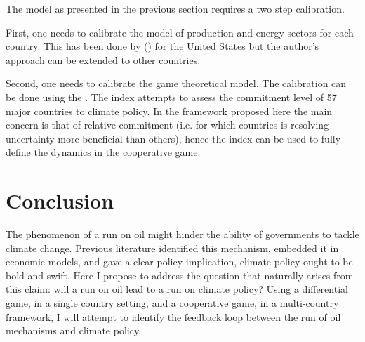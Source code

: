 \documentclass[american]{scrartcl}
\newcommand{\citein}[1]{\citeauthor{#1} (\citeyear{#1})}
\begin{document}
The model as presented in the previous section requires a two step calibration.

First, one needs to calibrate the model of production and energy sectors for each country. This has been done by \citein{Barnett2019} for the United States but the author's approach can be extended to other countries.

Second, one needs to calibrate the game theoretical model. The calibration can be done using the \citeauthor{Burck2020}. The index attempts to assess the commitment level of 57 major countries to climate policy. In the framework proposed here the main concern is that of relative commitment (i.e. for which countries is resolving uncertainty more beneficial than others), hence the index can be used to fully define the dynamics in the cooperative game.

\section{Conclusion}

The phenomenon of a run on oil might hinder the ability of governments to tackle climate change. Previous literature identified this mechanism, embedded it in economic models, and gave a clear policy implication, climate policy ought to be bold and swift. Here I propose to address the question that naturally arises from this claim: will a run on oil lead to a run on climate policy? Using a differential game, in a single country setting, and a cooperative game, in a multi-country framework, I will attempt to identify the feedback loop between the run of oil mechanisms and climate policy.

\newpage
\nocite{*}
\printbibliography
\end{document}
